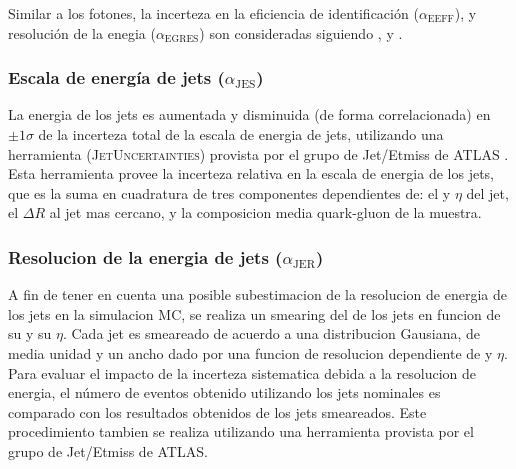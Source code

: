Similar a los fotones, la incerteza en la eficiencia de identificación ($\alpha_\text{EEFF}$), y resolución de
la enegia ($\alpha_\text{EGRES}$) son consideradas siguiendo \cite{EleEffTwiki}, \cite{EGScaleTwiki}
y \cite{MCPTwiki}.





\subsubsection{Escala de energía de jets ($\alpha_\mathrm{JES}$)}

La energia de los jets es aumentada y disminuida (de forma correlacionada) en
$\pm1\sigma$ de la incerteza total de la escala de energia de jets, utilizando
una herramienta (\textsc{JetUncertainties}) provista por el grupo de Jet/Etmiss de ATLAS \cite{JesTwiki}.
Esta herramienta provee la incerteza relativa en la escala de energia de los jets,
que es la suma en cuadratura de tres componentes dependientes de: el {\pt} y $\eta$
del jet, el $\Delta R$ al jet mas cercano, y la composicion media quark-gluon de la muestra.



\subsubsection{Resolucion de la energia de jets ($\alpha_\mathrm{JER}$)}

A fin de tener en cuenta una posible subestimacion de la resolucion de energia de los jets
en la simulacion MC, se realiza un smearing del {\pt} de los jets en funcion de su \pt y su $\eta$.
Cada jet es smeareado de acuerdo a una distribucion Gausiana, de media unidad y un ancho
dado por una funcion de resolucion dependiente de {\pt} y $\eta$. Para evaluar el impacto
de la incerteza sistematica debida a la resolucion de energia, el número de eventos obtenido utilizando
los jets nominales es comparado con los resultados obtenidos de los jets smeareados.
Este procedimiento tambien se realiza utilizando una herramienta provista por el grupo de Jet/Etmiss
de ATLAS.


